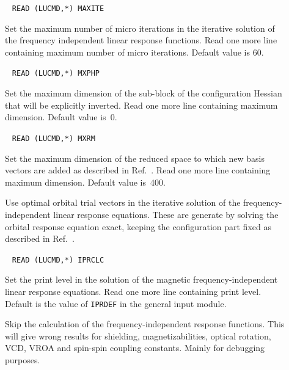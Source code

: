 \begin{description}
\item[]\verb| |\newline
\verb|READ (LUCMD,*) MAXITE|

Set the maximum number of micro iterations in the iterative solution of
the frequency independent linear response functions. Read one more line
containing maximum number of micro iterations. Default value is
60.

\item[]\verb| |\newline
\verb|READ (LUCMD,*) MXPHP|

Set the maximum dimension of the sub-block of the configuration
Hessian that will be explicitly inverted. Read one more line
containing maximum dimension. Default value is~0.

\item[]\verb| |\newline
\verb|READ (LUCMD,*) MXRM|

Set the maximum dimension of the reduced space to which new basis
vectors are added as described in Ref.~\cite{tuhjahjajpjjcp84}. Read
one more line containing maximum dimension. Default value is~400.

\item[] Use optimal orbital trial vectors in
the
iterative solution of the frequency-inde\-pen\-dent linear response
equations. These are generate by solving the orbital response equation
exact, keeping the configuration part fixed as described in
Ref.~\cite{tuhjahjajpjjcp84}.

\item[]\verb| |\newline
\verb|READ (LUCMD,*) IPRCLC|

Set the print level in the solution of the magnetic
frequency-independent linear response equations. Read one more line
containing print level. Default is the value of \verb|IPRDEF| in
the general input module.

\item[] Skip the calculation of the frequency-independent
response functions. This will give wrong results for shielding,
magnetizabilities, optical rotation, VCD, VROA and spin-spin coupling constants. Mainly for
debugging purposes.


\end{description}
